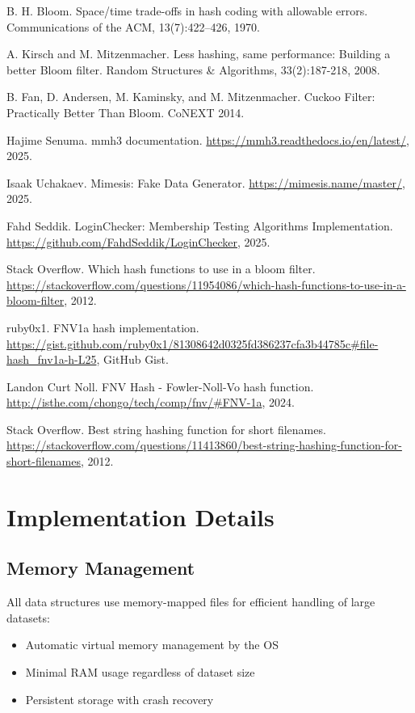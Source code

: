 \documentclass[sigconf]{acmart}
\begin{document}

\begin{thebibliography}{9}
B. H. Bloom. Space/time trade-offs in hash coding with allowable errors. Communications of the ACM, 13(7):422–426, 1970.

A. Kirsch and M. Mitzenmacher. Less hashing, same performance: Building a better Bloom filter. Random Structures \& Algorithms, 33(2):187-218, 2008.

B. Fan, D. Andersen, M. Kaminsky, and M. Mitzenmacher. Cuckoo Filter: Practically Better Than Bloom. CoNEXT 2014.

Hajime Senuma. mmh3 documentation. \url{https://mmh3.readthedocs.io/en/latest/}, 2025.

Isaak Uchakaev. Mimesis: Fake Data Generator. \url{https://mimesis.name/master/}, 2025.

Fahd Seddik. LoginChecker: Membership Testing Algorithms Implementation. \url{https://github.com/FahdSeddik/LoginChecker}, 2025.

Stack Overflow. Which hash functions to use in a bloom filter. \url{https://stackoverflow.com/questions/11954086/which-hash-functions-to-use-in-a-bloom-filter}, 2012.

ruby0x1. FNV1a hash implementation. \url{https://gist.github.com/ruby0x1/81308642d0325fd386237cfa3b44785c#file-hash_fnv1a-h-L25}, GitHub Gist.

Landon Curt Noll. FNV Hash - Fowler-Noll-Vo hash function. \url{http://isthe.com/chongo/tech/comp/fnv/#FNV-1a}, 2024.

Stack Overflow. Best string hashing function for short filenames. \url{https://stackoverflow.com/questions/11413860/best-string-hashing-function-for-short-filenames}, 2012.

\end{thebibliography}

\appendix
\section{Implementation Details}
\subsection{Memory Management}
All data structures use memory-mapped files for efficient handling of large datasets:
\begin{itemize}
\item Automatic virtual memory management by the OS
\item Minimal RAM usage regardless of dataset size
\item Persistent storage with crash recovery
\end{itemize}
\end{document}
